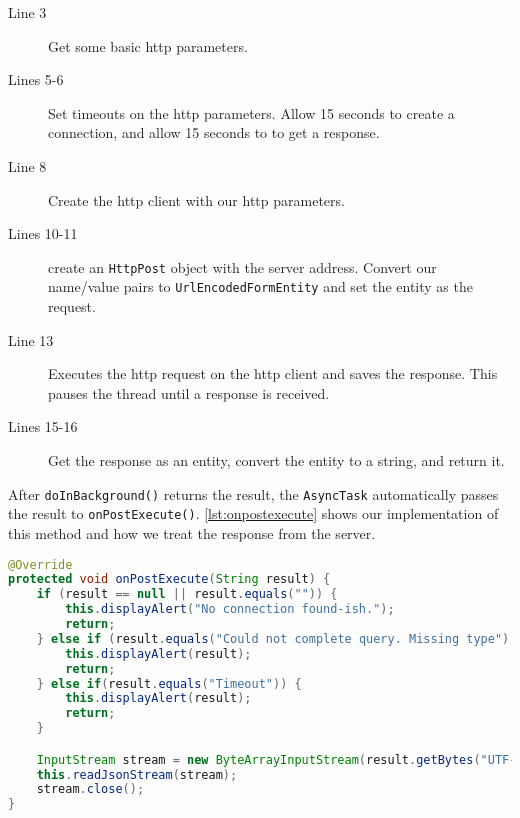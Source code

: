 \begin{description}
\item[Line 3] Get some basic http parameters.
\item[Lines 5-6] Set timeouts on the http parameters. Allow 15 seconds to create a connection, and allow 15 seconds to to get a response.
\item[Line 8] Create the http client with our http parameters.
\item[Lines 10-11]create an \lstinline|HttpPost| object with the server address. Convert our name/value pairs to \lstinline|UrlEncodedFormEntity| and set the entity as the request.
\item[Line 13] Executes the http request on the http client and saves the response. This pauses the thread until a response is received.
\item[Lines 15-16] Get the response as an entity, convert the entity to a string, and return it.
\end{description}
After \lstinline|doInBackground()| returns the result, the \lstinline|AsyncTask| automatically passes the result to \lstinline|onPostExecute()|. \autoref{lst:onpostexecute} shows our implementation of this method and how we treat the response from the server.

\begin{lstlisting}[language=java, label=lst:onpostexecute, caption={The async method \lstinline|onPostExecute()|}]
@Override
protected void onPostExecute(String result) {
    if (result == null || result.equals("")) {
        this.displayAlert("No connection found-ish.");
        return;
    } else if (result.equals("Could not complete query. Missing type") || result.equals("Missing request code!")) {
        this.displayAlert(result);
        return;
    } else if(result.equals("Timeout")) {
        this.displayAlert(result);
        return;
    }

    InputStream stream = new ByteArrayInputStream(result.getBytes("UTF-8"));
    this.readJsonStream(stream);
    stream.close();
}
\end{lstlisting}

